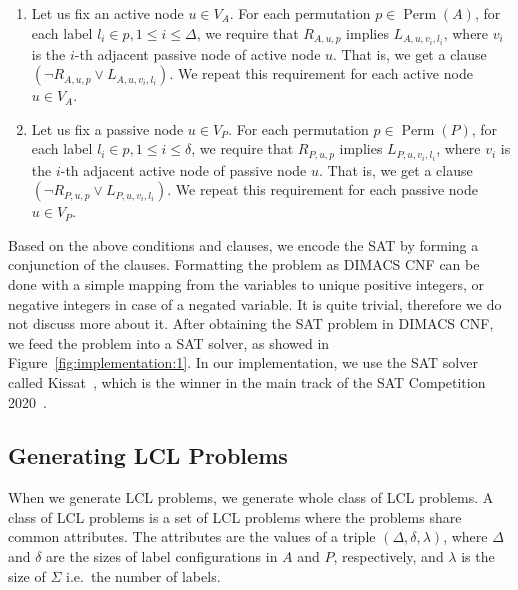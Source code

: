 \begin{enumerate}
\begin{enumerate}
  \item
    Let us fix an active node $u \in V_A$.
    For each permutation $p \in \operatorname{Perm}(A)$, for each label $l_i \in p, 1 \leq i \leq \Delta$, we require that $R_{A, u, p}$ implies $L_{A,u,v_i,l_i}$, where $v_i$ is the $i$-th adjacent passive node of active node $u$.
    That is, we get a clause $(\neg R_{A, u, p} \lor L_{A,u,v_i,l_i})$.
    We repeat this requirement for each active node $u \in V_A$.
    \label{enu:sat_conditions:3a}
  \item
    Let us fix a passive node $u \in V_P$.
    For each permutation $p \in \operatorname{Perm}(P)$, for each label $l_i \in p, 1 \leq i \leq \delta$, we require that $R_{P, u, p}$ implies $L_{P,u,v_i,l_i}$, where $v_i$ is the $i$-th adjacent active node of passive node $u$.
    That is, we get a clause $(\neg R_{P, u, p} \lor L_{P,u,v_i,l_i})$.
    We repeat this requirement for each passive node $u \in V_P$.
    \label{enu:sat_conditions:3b}
  \end{enumerate}
\end{enumerate}

Based on the above conditions and clauses, we encode the SAT by forming a conjunction of the clauses.
Formatting the problem as DIMACS CNF can be done with a simple mapping from the variables to unique positive integers, or negative integers in case of a negated variable.
It is quite trivial, therefore we do not discuss more about it.
After obtaining the SAT problem in DIMACS CNF, we feed the problem into a SAT solver, as showed in Figure~\ref{fig:implementation:1}.
In our implementation, we use the SAT solver called Kissat~\cite{BiereFazekasFleuryHeisinger-SAT-Competition-2020-solvers, Kissat}, which is the winner in the main track of the SAT Competition 2020~\cite{SatCompetition2020}.


\subsection{Generating LCL Problems} \label{sec:implementation:generating_lcl_problems}

When we generate LCL problems, we generate whole class of LCL problems.
A class of LCL problems is a set of LCL problems where the problems share common attributes.
The attributes are the values of a triple $(\Delta, \delta, \lambda)$, where $\Delta$ and $\delta$ are the sizes of label configurations in $A$ and $P$, respectively, and $\lambda$ is the size of $\Sigma$ i.e.\ the number of labels.

